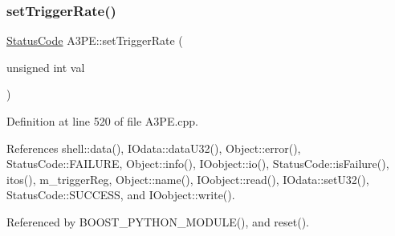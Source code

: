 \subsubsection{\texorpdfstring{set\+Trigger\+Rate()}{setTriggerRate()}}
{\footnotesize\ttfamily \hyperlink{classStatusCode}{Status\+Code} A3\+P\+E\+::set\+Trigger\+Rate (\begin{DoxyParamCaption}\item[{unsigned int}]{val }\end{DoxyParamCaption})}



Definition at line 520 of file A3\+P\+E.\+cpp.



References shell\+::data(), I\+Odata\+::data\+U32(), Object\+::error(), Status\+Code\+::\+F\+A\+I\+L\+U\+RE, Object\+::info(), I\+Oobject\+::io(), Status\+Code\+::is\+Failure(), itos(), m\+\_\+trigger\+Reg, Object\+::name(), I\+Oobject\+::read(), I\+Odata\+::set\+U32(), Status\+Code\+::\+S\+U\+C\+C\+E\+SS, and I\+Oobject\+::write().



Referenced by B\+O\+O\+S\+T\+\_\+\+P\+Y\+T\+H\+O\+N\+\_\+\+M\+O\+D\+U\+L\+E(), and reset().



